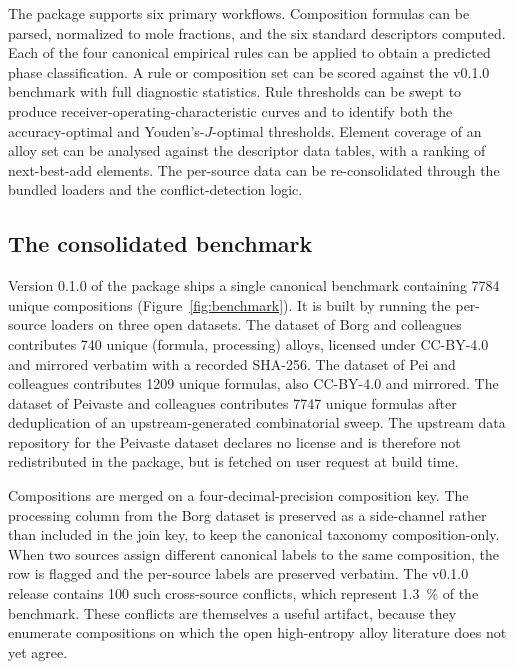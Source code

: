 \documentclass[review,times,nonatbib]{elsarticle}
\begin{document}
The package supports six primary workflows. Composition formulas
can be parsed, normalized to mole fractions, and the six standard
descriptors computed. Each of the four canonical empirical rules
can be applied to obtain a predicted phase classification. A
rule or composition set can be scored against the v0.1.0 benchmark
with full diagnostic statistics. Rule thresholds can be swept to
produce receiver-operating-characteristic curves and to identify
both the accuracy-optimal and Youden's-$J$-optimal thresholds.
Element coverage of an alloy set can be analysed against the
descriptor data tables, with a ranking of next-best-add elements.
The per-source data can be re-consolidated through the bundled
loaders and the conflict-detection logic.

\subsection{The consolidated benchmark}

Version 0.1.0 of the package ships a single canonical benchmark
containing \num{7784} unique compositions (Figure~\ref{fig:benchmark}).
It is built by running
the per-source loaders on three open datasets. The dataset of Borg
and colleagues \cite{borg2020} contributes \num{740} unique
(formula, processing) alloys, licensed under CC-BY-4.0 and
mirrored verbatim with a recorded SHA-256. The dataset of Pei and
colleagues \cite{pei2020} contributes \num{1209} unique formulas,
also CC-BY-4.0 and mirrored. The dataset of Peivaste and
colleagues \cite{peivaste2023} contributes \num{7747} unique
formulas after deduplication of an upstream-generated combinatorial
sweep. The upstream data repository for the Peivaste dataset
declares no license and is therefore not redistributed in the
package, but is fetched on user request at build time.

Compositions are merged on a four-decimal-precision composition
key. The processing column from the Borg dataset is preserved as a
side-channel rather than included in the join key, to keep
the canonical taxonomy composition-only. When two sources assign
different canonical labels to the same composition, the row is
flagged and the per-source labels are preserved verbatim. The
v0.1.0 release contains \num{100} such cross-source conflicts,
which represent \SI{1.3}{\percent} of the benchmark. These
conflicts are themselves a useful artifact, because they enumerate
compositions on which the open high-entropy alloy literature does
not yet agree.
\end{document}
